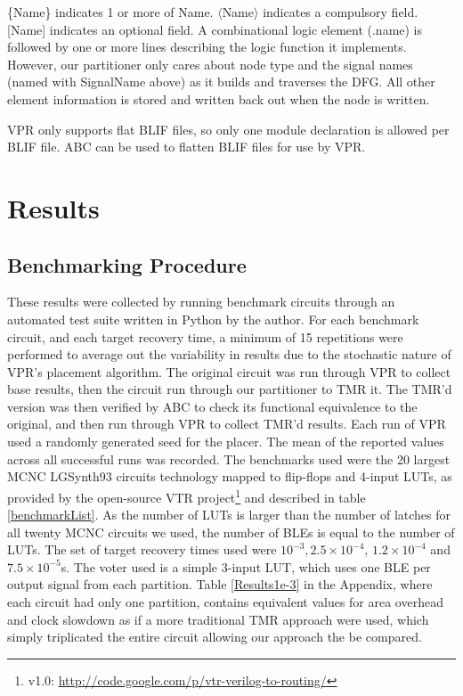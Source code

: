 \documentclass[12pt,final,oneside,a4paper]{dwThesis} %
\begin{document}
   \{Name\} indicates 1 or more of Name. $\langle$Name$\rangle$ indicates a
   compulsory field. [Name] indicates an optional field.  A combinational logic
   element (.name) is followed by one or more lines describing the logic
   function it implements. However, our partitioner only cares about node type
   and the signal names (named with SignalName above) as it builds and traverses the
   \gls{DFG}. All other element information is stored and written back out when
   the node is written.

   \gls{VPR} only supports flat \gls{BLIF} files, so only one module
   declaration is allowed per \gls{BLIF} file. \gls{ABC} can be used to flatten
   \gls{BLIF} files for use by \gls{VPR}.




   \chapter{Results}\label{results}

   \section{Benchmarking Procedure}
   These results were
   collected by running benchmark circuits through an automated test suite
   written in Python by the author. For each benchmark circuit, and each target
   recovery time, a minimum of 15 repetitions were performed to average out the variability
   in results due to the stochastic nature of \gls{VPR}'s placement algorithm.
   The original circuit was run through \gls{VPR} to collect base results, then the
   circuit run through our partitioner to \gls{TMR} it. The \gls{TMR}'d version was then
   verified by \gls{ABC} to check its functional equivalence to the original,
   and then run through \gls{VPR} to collect \gls{TMR}'d results. Each run of \gls{VPR} used a
   randomly generated seed for the placer.  The mean of the reported values
   across all successful runs was recorded.  The benchmarks used were the 20
   largest \gls{MCNC} LGSynth93 circuits technology mapped to flip-flops and 4-input \glspl{LUT}, as provided by the open-source
   \gls{VTR} project\footnote{v1.0: \url{http://code.google.com/p/vtr-verilog-to-routing/}} and described in table
   \ref{benchmarkList}.
   As the number of \glspl{LUT} is larger than the number of latches for all twenty \gls{MCNC} circuits we used, the number of \glspl{BLE} is equal to the number of \glspl{LUT}.
    The set of target recovery times used were $10^{-3},
   2.5\times10^{-4}$, $1.2\times10^{-4}$ and $7.5\times10^{-5}$s.  The voter used is a simple
   3-input \gls{LUT}, which uses one \gls{BLE} per output signal from each
   partition.
   Table \ref{Results1e-3} in the Appendix, where each circuit had only one partition, contains equivalent values for area overhead and clock slowdown as if a 
   more traditional \gls{TMR} approach were used, which simply triplicated the entire circuit allowing our approach the be compared.
\end{document}
